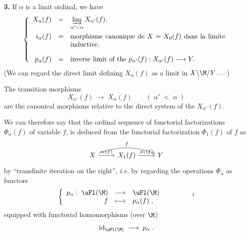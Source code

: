\textbf{3.} If $\alpha$ is a limit ordinal, we have
\[
\left\{
\begin{array}{rcl}
X_\alpha(f) & = & \varinjlim\limits_{\alpha'<\alpha} X_{\alpha'}(f). \\[3ex]
i_\alpha(f) & = & \parbox[t]{8cm}{morphisme canonique de $X = X_0(f)$ dans la limite inductive.} \\[5ex]
p_\alpha(f) & = & \text{inverse limit of the } p_{\alpha'}(f) : X_{\alpha'}(f) \longrightarrow Y.
\end{array}
\right.
\]
(We can regard the direct limit defining $X_\alpha(f)$ as a limit in $X\backslash\M/Y\dots$)

The transition morphisms
\[
X_{\alpha'}(f) \;\longrightarrow\; X_\alpha(f) \qquad (\; \alpha' \;<\; \alpha \;)
\]
are the canonical morphisms relative to the direct system of the $X_{\alpha'}(f)$.


We can therefore say that the ordinal sequence of functorial factorizations $\Phi_\alpha(f)$ of variable $f$, is deduced from the functorial factorization $\Phi_1(f)$ of $f$ as
\[
\begin{tikzcd}
X \arrow[r, "i_1(f)"] \arrow[rr, bend left=20, "f"] & X_1(f) \arrow[r, "p_1(f)"] & Y
\end{tikzcd}
\]
by ``transfinite iteration on the right'', \textit{i.e.} by regarding the operations $\Phi_\alpha$ as functors
\[
\left\{
\begin{array}{rcl}
p_\alpha :\; \uFl(\M) & \longrightarrow & \uFl(\M) \\
f & \longmapsto & p_\alpha(f) \;,
\end{array}
\right.
\qquad\qquad \text{\footnotemark}
\]
equipped with functorial homomorphisms (over $\M$)
\[
\mathrm{id}_{\uFl(\M)} \;\longrightarrow\; p_\alpha \;.
\]